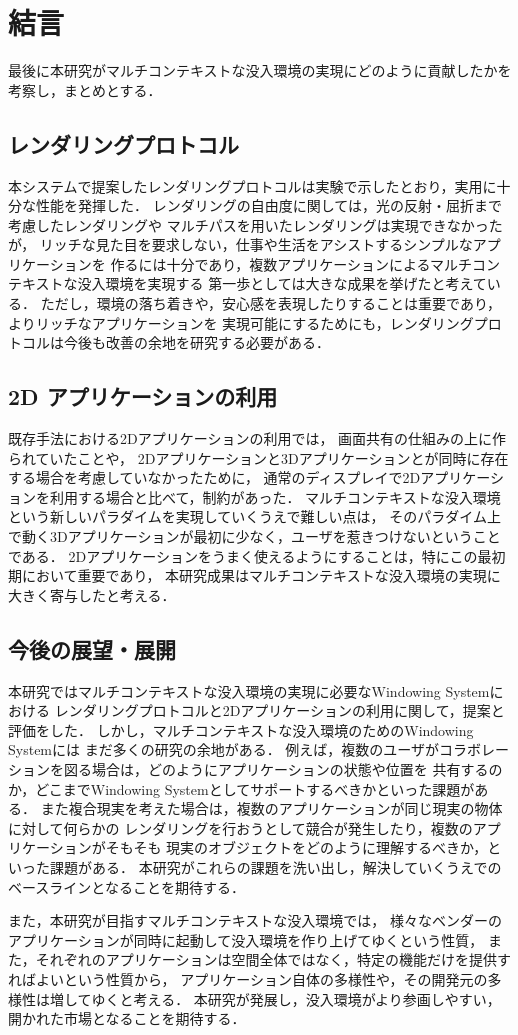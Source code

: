 \chapter{結言}


最後に本研究がマルチコンテキストな没入環境の実現にどのように貢献したかを考察し，まとめとする．

\section{レンダリングプロトコル}

本システムで提案したレンダリングプロトコルは実験で示したとおり，実用に十分な性能を発揮した．
レンダリングの自由度に関しては，光の反射・屈折まで考慮したレンダリングや
マルチパスを用いたレンダリングは実現できなかったが，
リッチな見た目を要求しない，仕事や生活をアシストするシンプルなアプリケーションを
作るには十分であり，複数アプリケーションによるマルチコンテキストな没入環境を実現する
第一歩としては大きな成果を挙げたと考えている．
ただし，環境の落ち着きや，安心感を表現したりすることは重要であり，よりリッチなアプリケーションを
実現可能にするためにも，レンダリングプロトコルは今後も改善の余地を研究する必要がある．

\section{2D アプリケーションの利用}

既存手法における2Dアプリケーションの利用では，
画面共有の仕組みの上に作られていたことや，
2Dアプリケーションと3Dアプリケーションとが同時に存在する場合を考慮していなかったために，
通常のディスプレイで2Dアプリケーションを利用する場合と比べて，制約があった．
マルチコンテキストな没入環境という新しいパラダイムを実現していくうえで難しい点は，
そのパラダイム上で動く3Dアプリケーションが最初に少なく，ユーザを惹きつけないということである．
2Dアプリケーションをうまく使えるようにすることは，特にこの最初期において重要であり，
本研究成果はマルチコンテキストな没入環境の実現に大きく寄与したと考える．

\section{今後の展望・展開}

本研究ではマルチコンテキストな没入環境の実現に必要なWindowing Systemにおける
レンダリングプロトコルと2Dアプリケーションの利用に関して，提案と評価をした．
しかし，マルチコンテキストな没入環境のためのWindowing Systemには
まだ多くの研究の余地がある．
例えば，複数のユーザがコラボレーションを図る場合は，どのようにアプリケーションの状態や位置を
共有するのか，どこまでWindowing Systemとしてサポートするべきかといった課題がある．
また複合現実を考えた場合は，複数のアプリケーションが同じ現実の物体に対して何らかの
レンダリングを行おうとして競合が発生したり，複数のアプリケーションがそもそも
現実のオブジェクトをどのように理解するべきか，といった課題がある．
本研究がこれらの課題を洗い出し，解決していくうえでのベースラインとなることを期待する．

また，本研究が目指すマルチコンテキストな没入環境では，
様々なベンダーのアプリケーションが同時に起動して没入環境を作り上げてゆくという性質，
また，それぞれのアプリケーションは空間全体ではなく，特定の機能だけを提供すればよいという性質から，
アプリケーション自体の多様性や，その開発元の多様性は増してゆくと考える．
本研究が発展し，没入環境がより参画しやすい，開かれた市場となることを期待する．
